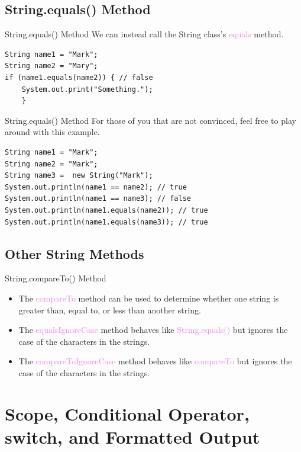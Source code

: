 \documentclass[11pt]{beamer}
\newcommand{\violet}[1]{\textcolor{violet}{#1}}
\begin{document}
\subsection{String.equals() Method}
\begin{frame}[fragile]{String.equals() Method}
    We can instead call the String class's \violet{equals} method.
        \begin{lstlisting}
String name1 = "Mark";
String name2 = "Mary";
if (name1.equals(name2)) { // false
    System.out.print("Something.");
    }
    \end{lstlisting}
\end{frame}

\begin{frame}[fragile]{String.equals() Method}
    For those of you that are not convinced, feel free to play around with this example.
        \begin{lstlisting}
String name1 = "Mark";
String name2 = "Mark";
String name3 =  new String("Mark"); 
System.out.println(name1 == name2); // true
System.out.println(name1 == name3); // false
System.out.println(name1.equals(name2)); // true
System.out.println(name1.equals(name3)); // true
        \end{lstlisting}
\end{frame}

\subsection{Other String Methods}
\begin{frame}[fragile]{String.compareTo() Method}
    \begin{itemize}
        \item
            The \violet{compareTo} method can be used to determine whether one string is greater than, equal to, or less than another string.
        \item
            The \violet{equalsIgnoreCase} method behaves like \violet{String.equals()} but ignores the case of the characters in the strings.
        \item
            The \violet{compareToIgnoreCase} method behaves like \violet{compareTo} but ignores the case of the characters in the strings.
    \end{itemize}
\end{frame}

\section{Scope, Conditional Operator, switch, and Formatted Output}
\end{document}
